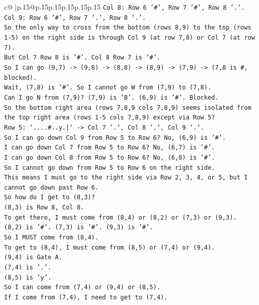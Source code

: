 \documentclass{article}
\begin{document}
{\begin{supertabular}{c@{$\;$}|p{.15\linewidth}@{}p{.15\linewidth}p{.15\linewidth}p{.15\linewidth}p{.15\linewidth}p{.15\linewidth}}
{{{\texttt{Col 8: Row 6 '\#', Row 7 '\#', Row 8 '.'.} \\
\texttt{Col 9: Row 6 '\#', Row 7 '.', Row 8 '.'.} \\
\texttt{So the only way to cross from the bottom (rows 8,9) to the top (rows 1{-}5) on the right side is through Col 9 (at row 7,8) or Col 7 (at row 7).} \\
\texttt{But Col 7 Row 8 is '\#'. Col 8 Row 7 is '\#'.} \\
\texttt{So I can go (9,7) {-}> (9,8) {-}> (8,8) {-}> (8,9) {-}> (7,9) {-}> (7,8 is \#, blocked).} \\
\texttt{Wait, (7,8) is '\#'. So I cannot go W from (7,9) to (7,8).} \\
\texttt{Can I go N from (7,9)? (7,9) is 'B'. (6,9) is '\#'. Blocked.} \\
\texttt{So the bottom right area (rows 7,8,9 cols 7,8,9) seems isolated from the top right area (rows 1{-}5 cols 7,8,9) except via Row 5?} \\
\texttt{Row 5: `....\#..y.|` {-}> Col 7 '.', Col 8 '.', Col 9 '.'.} \\
\texttt{So I can go down Col 9 from Row 5 to Row 6? No, (6,9) is '\#'.} \\
\texttt{I can go down Col 7 from Row 5 to Row 6? No, (6,7) is '\#'.} \\
\texttt{I can go down Col 8 from Row 5 to Row 6? No, (6,8) is '\#'.} \\
\texttt{So I cannot go down from Row 5 to Row 6 on the right side.} \\
\texttt{This means I must go to the right side via Row 2, 3, 4, or 5, but I cannot go down past Row 6.} \\
\texttt{So how do I get to (8,3)?} \\
\texttt{(8,3) is Row 8, Col 8.} \\
\texttt{To get there, I must come from (8,4) or (8,2) or (7,3) or (9,3).} \\
\texttt{(8,2) is '\#'. (7,3) is '\#'. (9,3) is '\#'.} \\
\texttt{So I MUST come from (8,4).} \\
\texttt{To get to (8,4), I must come from (8,5) or (7,4) or (9,4).} \\
\texttt{(9,4) is Gate A.} \\
\texttt{(7,4) is '.'.} \\
\texttt{(8,5) is 'y'.} \\
\texttt{So I can come from (7,4) or (9,4) or (8,5).} \\
\texttt{If I come from (7,4), I need to get to (7,4).} \\
}}}
\end{supertabular}}
\end{document}
